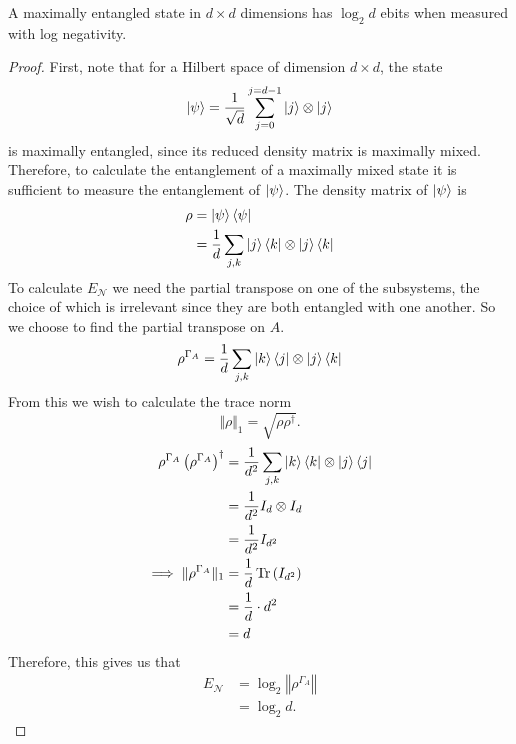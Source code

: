 \begin{claim}
    \label{claim:maximally_entangled_states}
    A maximally entangled state in $d\times d$ dimensions has $\log_2d$ ebits when measured with log negativity.
\end{claim}
\begin{proof}
    First, note that for a Hilbert space of dimension $d\times d$, the state
    \begin{equation}
        \ket{\psi} = \frac{1}{\sqrt{d}}\sum_{j=0}^{j=d-1}\ket{j}\otimes\ket{j}
    \end{equation}
    is maximally entangled, since its reduced density matrix is maximally mixed.
    Therefore, to calculate the entanglement of a maximally mixed state it is sufficient to measure the entanglement of $\ket{\psi}$.
    The density matrix of $\ket{\psi}$ is 
    \begin{align}
        \rho &= \ket{\psi}\bra{\psi}\\
        &=\frac{1}{d} \sum_{j,k}\ket{j}\bra{k}\otimes\ket{j}\bra{k}
    \end{align}
    To calculate $E_{\mathcal{N}}$ we need the partial transpose on one of the subsystems, the choice of which is irrelevant since they are both entangled with one another.
    So we choose to find the partial transpose on $A$.
    \begin{align}
        \rho^{\Gamma_A} =\frac{1}{d} \sum_{j,k}\ket{k}\bra{j}\otimes\ket{j}\bra{k}
    \end{align}
    From this we wish to calculate the trace norm 
    \begin{equation}
        \Vert\rho\Vert_1 = \sqrt{\rho\rho^{\dagger}}.
    \end{equation}
    \begin{align}
        \rho^{\Gamma_A}\left(\rho^{\Gamma_A}\right)^{\dagger} &= \frac{1}{d^2} \sum_{j,k}\ket{k}\bra{k}\otimes\ket{j}\bra{j}\\
        &=\frac{1}{d^2}I_d\otimes I_d\\
        &=\frac{1}{d^2}I_{d^2}\\
        \implies \Vert\rho^{\Gamma_A}\Vert_1 &= \frac{1}{d}\operatorname{Tr}{\left(I_{d^2}\right)}\\
        &= \frac{1}{d}\cdot d^2\\
        &= d
    \end{align}
    Therefore, this gives us that
    \begin{align}
        E_{\mathcal{N}} &= \log_2\left\Vert \rho^{\Gamma_A}\right\Vert\\
        &= \log_2d.
    \end{align}
\end{proof}